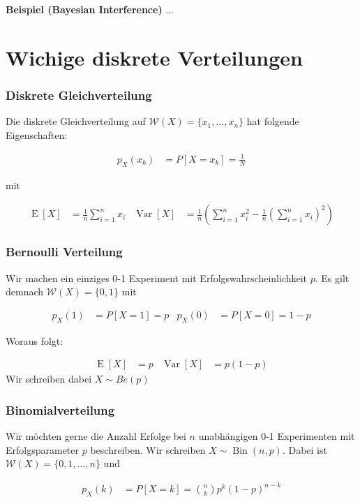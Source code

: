 \documentclass[25pt]{sciposter}
\newcommand{\W}{\mathcal{W}}
\newcommand{\Var}{\operatorname{Var}}
\newcommand{\E}{\operatorname{E}}
\newcommand{\TODO}[1]{\todo[inline]{\Large TODO:  #1}}
\begin{document}
\begin{multicols}{3}
\textbf{Beispiel (Bayesian Interference)}
...
\TODO{}


\section{Wichige diskrete Verteilungen}

\subsubsection*{Diskrete Gleichverteilung}
Die diskrete Gleichverteilung auf  $\W(X)=\{x_1,\ldots,x_n\}$ hat folgende Eigenschaften:

\begin{align*}
	p_X(x_k) &= P[X = x_k] = \frac{1}{N}
\end{align*}

mit 

\begin{align*}
	\operatorname {E}[X]&={\frac  {1}{n}}\sum _{{i=1}}^{n}x_{i} & \operatorname {Var}[X]&={\frac  {1}{n}}\left(\sum _{{i=1}}^{n}x_{i}^{2}-{\frac  {1}{n}}\left(\sum _{{i=1}}^{n}x_{i}\right)^{2}\right)
\end{align*}

\subsubsection*{Bernoulli Verteilung}
Wir machen ein einziges 0-1 Experiment mit Erfolgswahrscheinlichkeit $p$. Es gilt demnach $\W(X) = \{0,1\}$ mit 

\begin{align*}
	p_X(1) &= P[X=1] = p & 	p_X(0) &= P[X=0] = 1-p
\end{align*}

Woraus folgt:

\begin{align*}
	\E[X] &= p & \Var[X] &= p(1-p)
\end{align*}
Wir schreiben dabei $X\sim {Be}(p)$

\subsubsection*{Binomialverteilung}
Wir möchten gerne die Anzahl Erfolge bei $n$ unabhängigen 0-1 Experimenten mit Erfolgsparameter $p$ beschreiben. Wir schreiben $X \sim \operatorname{Bin}(n,p)$. Dabei ist $\W(X) = \{0,1,\ldots,n\}$ und 

\begin{align*}
	p_X(k) &= P[X=k] = {n \choose k} p^k (1-p)^{n-k}
\end{align*}


\end{multicols}
\end{document}
